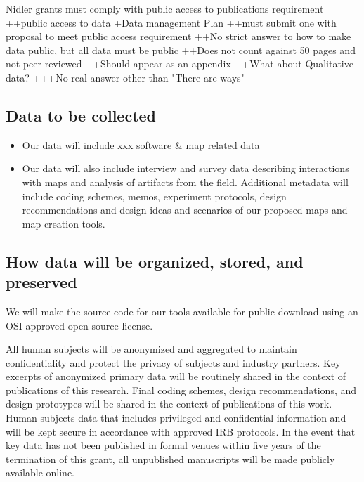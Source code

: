 Nidler grants must comply with public access to publications requirement
++public access to data
+Data management Plan
++must submit one with proposal to meet public access requirement
++No strict answer to how to make data public, but all data must be public
++Does not count against 50 pages and not peer reviewed
++Should appear as an appendix
++What about Qualitative data?
+++No real answer other than "There are ways"

\subsection{Data to be collected}
\begin{itemize}
    \item Our data will include xxx software & map related data 
    \item Our  data will also include interview and 
survey data describing interactions with maps and analysis of artifacts from the field. Additional metadata will include coding schemes, memos, experiment protocols,  design recommendations and design ideas and scenarios of our proposed maps and map creation tools.
\end{itemize}

\subsection{How data will be organized, stored, and preserved}

We will make the source code for our tools   available for public download  using an OSI-approved open source license. 

All human subjects will be anonymized and aggregated to maintain confidentiality 
and protect the privacy of subjects and industry partners. 
Key excerpts of anonymized primary data will be routinely shared 
in the context of publications of this research.  
Final coding schemes, design recommendations, and design prototypes will be shared in the context of publications of this work. Human subjects data that includes privileged and confidential information 
and will be kept secure in accordance with approved IRB protocols.  
In the event that key data has not been published in formal venues within 
five years of the termination of this grant, 
all unpublished manuscripts will be made publicly available online.


